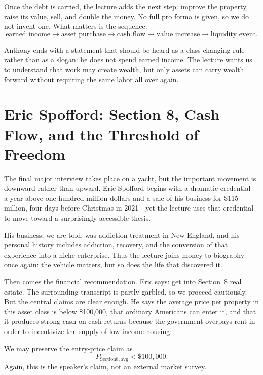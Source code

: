 Once the debt is carried, the lecture adds the next step: improve the property, raise its value, sell, and double the money. No full pro forma is given, so we do not invent one. What matters is the sequence:
\begin{equation}
\text{earned income} \longrightarrow \text{asset purchase} \longrightarrow \text{cash flow} \longrightarrow \text{value increase} \longrightarrow \text{liquidity event}.
\end{equation}

Anthony ends with a statement that should be heard as a class-changing rule rather than as a slogan: he does not spend earned income. The lecture wants us to understand that work may create wealth, but only assets can carry wealth forward without requiring the same labor all over again.

\section{Eric Spofford: Section 8, Cash Flow, and the Threshold of Freedom}

The final major interview takes place on a yacht, but the important movement is downward rather than upward. Eric Spofford begins with a dramatic credential---a year above one hundred million dollars and a sale of his business for \$115 million, four days before Christmas in 2021---yet the lecture uses that credential to move toward a surprisingly accessible thesis.

His business, we are told, was addiction treatment in New England, and his personal history includes addiction, recovery, and the conversion of that experience into a niche enterprise. Thus the lecture joins money to biography once again: the vehicle matters, but so does the life that discovered it.

Then comes the financial recommendation. Eric says: get into Section~8 real estate. The surrounding transcript is partly garbled, so we proceed cautiously. But the central claims are clear enough. He says the average price per property in this asset class is below \$100{,}000, that ordinary Americans can enter it, and that it produces strong cash-on-cash returns because the government overpays rent in order to incentivize the supply of low-income housing.

We may preserve the entry-price claim as
\begin{equation}
P_{\mathrm{Section8,avg}} < \$100{,}000.
\end{equation}
Again, this is the speaker's claim, not an external market survey.

